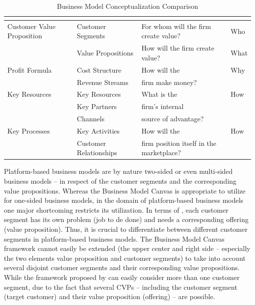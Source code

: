 \begin{table}[t]
	\caption{Business Model Conceptualization Comparison}
	\label{tab:bmcc}
	\centering
	\begin{tabular}{L{.2\textwidth}L{.2\textwidth}L{.2\textwidth}L{.2\textwidth}}
			\toprule 
			\small \textbf{\citet{Johnson2008}} & \small \textbf{\citet{Osterwalder2010}} & \small \textbf{\citet{Morris2005}} & \small \textbf{\citet{Frankenberger2013}} \\ \midrule
			\small Customer Value Proposition & \small Customer Segments & \small For whom will the firm create value? & \small Who \\
				& \small Value Propositions & \small How will the firm create value? & \small What \\ \midrule
			\small Profit Formula	& \small Cost Structure &  \small How will the & \small Why\\
				& \small Revenue Streams &  \small firm make money? &\\ \midrule
			\small Key Resources & \small Key Resources & \small What is the & \small How\\
				& \small Key Partners & \small firm's internal &\\
				& \small Channels & \small source of advantage? &\\ \midrule
			\small Key Processes & \small Key Activities & \small How will the & \small How\\
				& \small Customer Relationships & \small firm position itself in the marketplace? &\\ \bottomrule
	\end{tabular}
\end{table}

Platform-based business models are by nature two-sided or even multi-sided business models -- in respect of the customer segments and the corresponding value propositions. Whereas the Business Model Canvas is appropriate to utilize for one-sided business models, in the domain of platform-based business models one major shortcoming restricts its utilization. In terms of \citet{Johnson2008}, each customer segment has its own problem (job to de done) and needs a corresponding offering (value proposition). Thus, it is crucial to differentiate between different customer segments in platform-based business models. The Business Model Canvas framework cannot easily be extended (the upper center and right side -- especially the two elements value proposition and customer segments) to take into account several disjoint customer segments and their corresponding value propositions. While the framework proposed by \citet{Johnson2008} can easily consider more than one customer segment, due to the fact that several \acp{CVP} -- including the customer segment (target customer) and their value proposition (offering) -- are possible.

